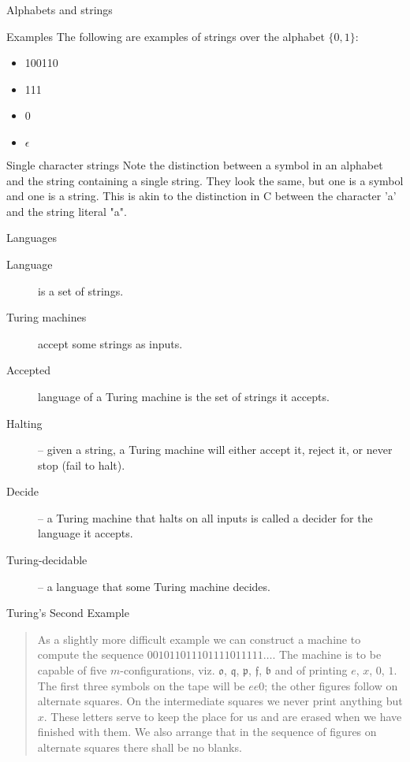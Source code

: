 \begin{frame}{Alphabets and strings}
  \begin{alertblock}{Examples}
    The following are examples of strings over the alphabet $\{0,1\}$:
    \begin{itemize}
      \item 100110
      \item 111
      \item 0
      \item $\epsilon$
    \end{itemize}
  \end{alertblock}
\begin{alertblock}{Single character strings}
Note the distinction between a symbol in an alphabet and the string containing a single string.
They look the same, but one is a symbol and one is a string. 
This is akin to the distinction in C between the character 'a' and the string literal "a".
\end{alertblock}
\end{frame}


\begin{frame}{Languages}

\begin{description}
  \item[Language] is a set of strings.
  \item[Turing machines] accept some strings as inputs.
  \item[Accepted] language of a Turing machine is the set of strings it accepts.
  \item[Halting] -- given a string, a Turing machine will either accept it, reject it, or never stop (fail to halt).
  \item[Decide] -- a Turing machine that halts on all inputs is called a decider for the language it accepts.
  \item[Turing-decidable] -- a language that some Turing machine decides.
\end{description}

\end{frame}



\begin{frame}{Turing's Second Example}
  \begin{quote}
    As a slightly more difficult example we can construct a machine to compute the sequence $001011011101111011111\ldots$.
    The machine is to be capable of five $m$-configurations, viz. $\mathfrak{o}$, $\mathfrak{q}$, $\mathfrak{p}$, $\mathfrak{f}$, $\mathfrak{b}$ and of printing $e$, $x$, $0$, $1$.
    The first three symbols on the tape will be $ee0$; the other figures follow on alternate squares.
    On the intermediate squares we never print anything but $x$.
    These letters serve to keep the place for us and are erased when we have finished with them.
    We also arrange that in the sequence of figures on alternate squares there shall be no blanks.
  \end{quote}
\end{frame}



